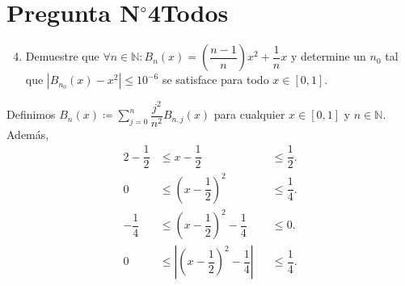 \section{Pregunta N$^{\circ}$4\qquad Todos}



\begin{frame}
	\begin{enumerate}\setcounter{enumi}{3}
		\item

		      Demuestre que
		      \begin{math}
			      \forall n\in\mathbb{N}:
			      B_{n}\left(x\right)=
			      \left(\dfrac{n-1}{n}\right)x^{2}+
			      \dfrac{1}{n}x
		      \end{math}
		      y determine un $n_{0}$ tal que
		      \begin{math}
			      \left|
			      B_{n_{0}}\left(x\right)-
			      x^{2}
			      \right|\leq
			      10^{-6}
		      \end{math}
		      se satisface para todo $x\in\left[0,1\right]$.
	\end{enumerate}

	\begin{solution}
		Definimos
		\begin{math}
			B_{n}\left(x\right)\coloneqq
			\sum\limits_{j=0}^{n}
			\dfrac{j^{2}}{n^{2}}
			B_{n,j}\left(x\right)
		\end{math}
		para cualquier $x\in\left[0,1\right]$ y $n\in\mathbb{N}$.
		Además,
		\begin{alignat*}{2}
			-\dfrac{1}{2} & \leq x-\dfrac{1}{2}                                              &  & \leq \dfrac{1}{2}. \\
			0             & \leq {\left(x-\dfrac{1}{2}\right)}^{2}                           &  & \leq \dfrac{1}{4}. \\
			-\dfrac{1}{4} & \leq {\left(x-\dfrac{1}{2}\right)}^{2}-\dfrac{1}{4}              &  & \leq 0.            \\
			0             & \leq \left|{\left(x-\dfrac{1}{2}\right)}^{2}-\dfrac{1}{4}\right| &  & \leq \dfrac{1}{4}.
		\end{alignat*}


\end{solution}
\end{frame}
